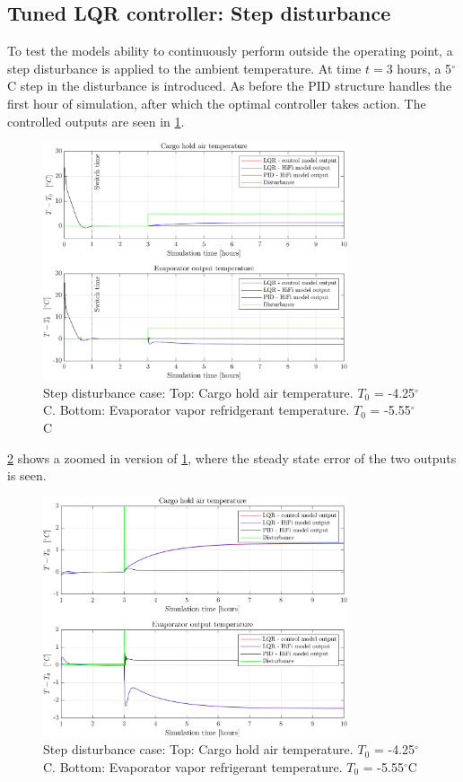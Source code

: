 \newpage
\subsection{Tuned LQR controller: Step disturbance}
To test the models ability to continuously perform outside the operating point, a step disturbance is applied to the ambient temperature.  At time $t=3$ hours, a 5$^{\circ}$C step in the disturbance is introduced. As before the PID structure handles the first hour of simulation, after which the optimal controller takes action. The controlled outputs are seen in \cref{fig:LQR_wellTuned_5stepDist}.

\begin{figure}[H]
	\centering
	\includegraphics[width=0.8\textwidth]{Graphics/fig_LQRvsKresten_stepDist.png}
	\caption{Step disturbance case: Top: Cargo hold air temperature. $T_0$ = -4.25$^{\circ}$C. Bottom: Evaporator vapor refridgerant temperature. $T_0$ = -5.55$^{\circ}$C}
	\label{fig:LQR_wellTuned_5stepDist}
\end{figure}

\noindent \cref{fig:LQR_wellTuned_5stepDist_zoom} shows a zoomed in version of \cref{fig:LQR_wellTuned_5stepDist}, where the steady state error of the two outputs is seen.

\begin{figure}[H]
	\centering
	\includegraphics[width=0.8\textwidth]{Graphics/fig_LQRvsKresten_stepDist_zoom.png}
	\caption{Step disturbance case: Top: Cargo hold air temperature. $T_0$ = -4.25$^{\circ}$C. Bottom: Evaporator vapor refrigerant temperature. $T_0$ = -5.55$^{\circ}$C}
	\label{fig:LQR_wellTuned_5stepDist_zoom}
\end{figure}

